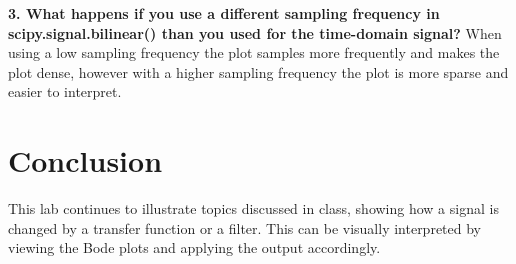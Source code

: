 \documentclass[12pt]{report}
\begin{document}
\textbf{3. What happens if you use a different sampling frequency in scipy.signal.bilinear() than
you used for the time-domain signal?}\newline \newline
When using a low sampling frequency the plot samples more frequently and makes the plot dense, however with a higher sampling frequency the plot is more sparse and easier to interpret. 
\section{Conclusion}
This lab continues to illustrate topics discussed in class, showing how a signal is changed by a transfer function or a filter. This can be visually interpreted by viewing the Bode plots and applying the output accordingly. 
\newpage
\end{document}
